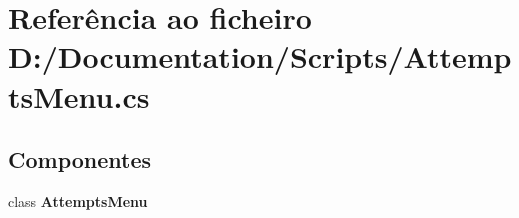 \section{Referência ao ficheiro D\+:/\+Documentation/\+Scripts/\+Attempts\+Menu.cs}
\label{_attempts_menu_8cs}
\subsection*{Componentes}
\begin{DoxyCompactItemize}
\item 
class \textbf{ Attempts\+Menu}
\end{DoxyCompactItemize}
